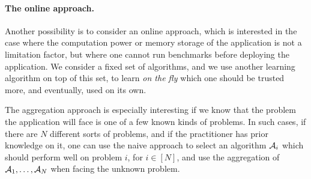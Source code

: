 \paragraph{The online approach.}
%
Another possibility is to consider an online approach, which is interested in the case where the computation power or memory storage of the application is not a limitation factor, but where one cannot run benchmarks before deploying the application.
We consider a fixed set of algorithms, and we use another learning algorithm on top of this set, to learn \emph{on the fly} which one should be trusted more, and eventually, used on its own.

The aggregation approach is especially interesting if we know that the problem the application will face is one of a few known kinds of problems.
In such cases, if there are $N$ different sorts of problems, and if the practitioner has prior knowledge on it, one can use the naive approach to select an algorithm $\mathcal{A}_i$ which should perform well on problem $i$, for $i\in[N]$,
and use the aggregation of $\mathcal{A}_1,\dots,\mathcal{A}_N$ when facing the unknown problem.





